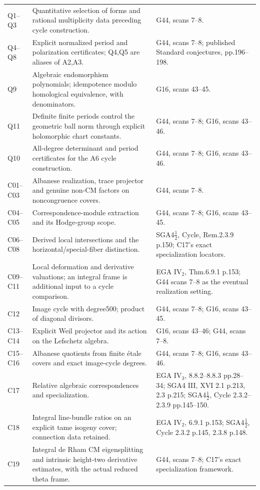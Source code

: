 \documentclass[11pt]{article}
\theoremstyle{definition}\newtheorem{definition}[theorem]{Definition}\newtheorem{remark}[theorem]{Remark}
\begin{document}
\begin{longtable}{@{}p{.18\linewidth}p{.48\linewidth}p{.27\linewidth}@{}}
Q1--Q3 & Quantitative selection of forms and rational multiplicity data preceding cycle construction. & G44, scans 7--8.\\
Q4--Q8 & Explicit normalized period and polarization certificates; Q4,Q5 are aliases of A2,A3. & G44, scans 7--8; published Standard conjectures, pp.196--198.\\
Q9 & Algebraic endomorphism polynomials; idempotence modulo homological equivalence, with denominators. & G16, scans 43--45.\\
Q11 & Definite finite periods control the geometric ball norm through explicit holomorphic chart constants. & G44, scans 7--8; G16, scans 43--46.\\
Q10 & All-degree determinant and period certificates for the A6 cycle construction. & G44, scans 7--8; G16, scans 43--46.\\
C01--C03 & Albanese realization, trace projector and genuine non-CM factors on noncongruence covers. & G44, scans 7--8.\\
C04--C05 & Correspondence-module extraction and its Hodge-group scope. & G44, scans 7--8; G16, scans 43--45.\\
C06--C08 & Derived local intersections and the horizontal/special-fiber distinction. & SGA4$\frac12$, Cycle, Rem.2.3.9 p.150; C17's exact specialization locators.\\
C09--C11 & Local deformation and derivative valuations; an integral frame is additional input to a cycle comparison. & EGA IV$_2$, Thm.6.9.1 p.153; G44 scans 7--8 as the eventual realization setting.\\
C12 & Image cycle with degree500; product of diagonal divisors. & G44, scans 7--8; G16, scans 43--45.\\
C13--C14 & Explicit Weil projector and its action on the Lefschetz algebra. & G16, scans 43--46; G44, scans 7--8.\\
C15--C16 & Albanese quotients from finite \'etale covers and exact image-cycle degrees. & G44, scans 7--8; G16, scans 43--46.\\
C17 & Relative algebraic correspondences and specialization. & EGA IV$_3$, 8.8.2--8.8.3 pp.28--34; SGA4 III, XVI 2.1 p.213, 2.3 p.215; SGA4$\frac12$, Cycle 2.3.2--2.3.9 pp.145--150.\\
C18 & Integral line-bundle ratios on an explicit tame isogeny cover; connection data retained. & EGA IV$_2$, 6.9.1 p.153; SGA4$\frac12$, Cycle 2.3.2 p.145, 2.3.8 p.148.\\
C19 & Integral de Rham CM eigensplitting and intrinsic height-two derivative estimates, with the actual reduced theta frame. & G44, scans 7--8; C17's exact specialization framework.\\

\end{longtable}
\end{document}
